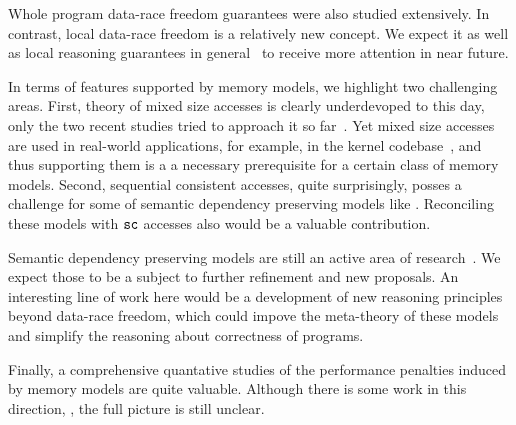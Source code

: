 Whole program data-race freedom guarantees were also studied extensively.
In contrast, local data-race freedom is a relatively new concept. 
We expect it as well as local reasoning guarantees 
in general~\cite{Dodds-al:ESOP18, Jagadeesan-al:OOPSLA2020, Cho-al:PLDI21} 
to receive more attention in near future.  

In terms of features supported by memory models, 
we highlight two challenging areas.
First, theory of mixed size accesses is clearly 
underdevoped to this day, only the two recent studies 
tried to approach it so far~\cite{Flur-al:POPL17, Watt-al:PLDI2020}.
Yet mixed size accesses are used in real-world applications,
for example, in the \Linux kernel codebase~\cite{Flur-al:POPL17},
and thus supporting them is a a necessary prerequisite 
for a certain class of memory models. 
Second, sequential consistent accesses, quite surprisingly,
posses a challenge for some of semantic dependency preserving
models like \Promising. Reconciling these models with ${\mathtt{sc}}$ 
accesses also would be a valuable contribution.

Semantic dependency preserving models are still an active 
area of research~\cite{Kang-al:POPL17, Lee-al:PLDI20, Cho-al:PLDI21,
Chakraborty-Vafeiadis:POPL19, Paviotti-al:ESOP20, 
Jagadeesan-al:OOPSLA2020}. 
We expect those to be a subject to 
further refinement and new proposals. 
An interesting line of work here would be 
a development of new reasoning principles
beyond data-race freedom, which could 
impove the meta-theory of these models and 
simplify the reasoning about correctness of programs.   

Finally, a comprehensive quantative studies 
of the performance penalties induced by memory models are quite valuable.
Although there is some work in this direction,%
\cite{Singh-al:ISCA12, Liu-al:OOPSLA17, Liu-al:PLDI19, 
Vollmer-al:PPoPP17, Dolan-al:PLDI18, Ou-Demsky:OOPSLA18}, 
the full picture is still unclear.
